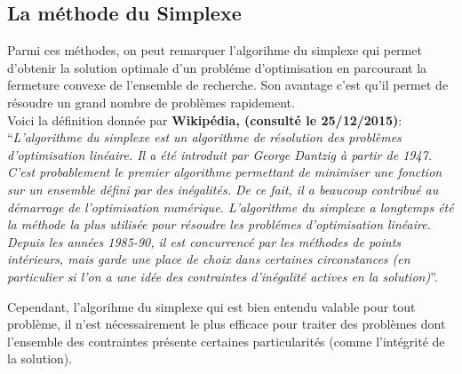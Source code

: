 \documentclass[a4paper,11pt,oneside]{report}
\theoremstyle{plain}
\newcommand{\0}{/ \! \! \! 0}
\theoremstyle{plain}
\begin{document}
\subsection{La m\'ethode du Simplexe}\label{simplexe}
 Parmi ces m\'ethodes, on peut remarquer l'algorihme du simplexe qui permet d'obtenir la solution optimale d'un probl\'eme d'optimisation en parcourant la 
 fermeture convexe de l'ensemble de recherche. Son avantage c'est qu'il permet de r\'esoudre un grand nombre de probl\`emes rapidement.\\\vspace{0.4cm}
 Voici la d\'efinition donn\'ee par {\bf Wikip\'edia, (consult\'e le 25/12/2015)}:\\
   ``{\it L'algorithme du simplexe est un algorithme de r\'esolution des probl\`emes d'optimisation lin\'eaire. Il a \'et\'e introduit par George Dantzig
 \`a partir de 1947. C'est probablement le premier algorithme permettant de minimiser une fonction sur un ensemble d\'efini par des in\'egalit\'es. 
De ce fait, il a beaucoup contribu\'e au d\'emarrage de l'optimisation num\'erique. L'algorithme du simplexe a longtemps \'et\'e la m\'ethode la plus utilis\'ee
 pour r\'esoudre les probl\'emes d'optimisation lin\'eaire. Depuis les ann\'ees 1985-90, il est concurrenc\'e par les m\'ethodes de points int\'erieurs, mais garde 
 une place de choix dans certaines circonstances (en particulier si l'on a une id\'ee des contraintes d'in\'egalit\'e actives en la solution)}''.
 \vspace{0.4cm}
 
                                                                                  
 Cependant, l'algorihme du simplexe qui est bien entendu valable pour tout probl\`eme, il n'est n\'ecessairement le plus efficace pour traiter des
 probl\`emes dont l'ensemble des contraintes pr\'esente certaines particularit\'es (comme l'int\'egrit\'e de la solution).
\end{document}
